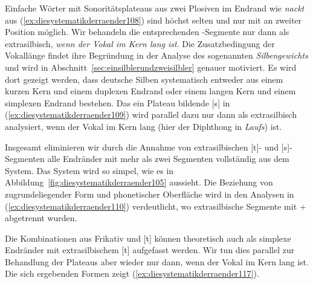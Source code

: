 Einfache Wörter mit Sonoritätsplateaus aus zwei Plosiven im Endrand wie \textit{nackt} aus (\ref{ex:diesystematikderraender108}) sind höchst selten und nur mit \textipa{[t]} an zweiter Position möglich.
Wir behandeln die entsprechenden \textipa{[t]}-Segmente nur dann als extrasilbisch, \textit{wenn der Vokal im Kern lang ist}.
Die Zusatzbedingung der Vokallänge findet ihre Begründung in der Analyse des sogenannten \textit{Silbengewichts} und wird in Abschnitt~\ref{sec:einsilblerundzweisilbler} genauer motiviert.
Es wird dort gezeigt werden, dass deutsche Silben systematisch entweder aus einem kurzen Kern und einem duplexen Endrand oder einem langen Kern und einem simplexen Endrand bestehen.
Das ein Plateau bildende [s] in (\ref{ex:diesystematikderraender109}) wird parallel dazu nur dann als extrasilbisch analysiert, wenn der Vokal im Kern lang (hier der Diphthong in \textit{Laufs}) ist.

Insgesamt eliminieren wir durch die Annahme von extrasilbischen [t]- und [s]-Segmenten alle Endränder mit mehr als zwei Segmenten vollständig aus dem System.
Das System wird so simpel, wie es in Abbildung~\ref{fig:diesystematikderraender105} aussieht.
Die Beziehung von zugrundeliegender Form und phonetischer Oberfläche wird in den Analysen in (\ref{ex:diesystematikderraender110}) verdeutlicht, wo extrasilbische Segmente mit + abgetrennt wurden.

\begin{exe}
  \ex \label{ex:diesystematikderraender110}
  \begin{xlist}
  \end{xlist}
\end{exe}

Die Kombinationen aus Frikativ und [t] können theoretisch auch als simplexe Endränder mit extrasilbischem [t] aufgefasst werden.
Wir tun dies parallel zur Behandlung der Plateaus aber wieder nur dann, wenn der Vokal im Kern lang ist.
Die sich ergebenden Formen zeigt (\ref{ex:diesystematikderraender117}).

